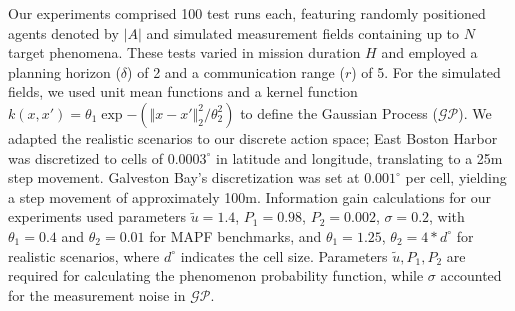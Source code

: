 \documentclass[letterpaper, 10 pt, conference]{IEEEConference}
\begin{document}
Our experiments comprised 100 test runs each, featuring randomly positioned agents denoted by $|A|$ and simulated measurement fields containing up to $N$ target phenomena. These tests varied in mission duration $H$ and employed a planning horizon ($\delta$) of 2 and a communication range ($r$) of 5. For the simulated fields, we used unit mean functions and a kernel function $k(x, x') = \theta_1\exp{- (\Vert x - x' \Vert_2^2 / \theta_2^2)}$ to define the Gaussian Process ($\mathcal{GP}$). We adapted the realistic scenarios to our discrete action space; East Boston Harbor was discretized to cells of $0.0003^\circ$ in latitude and longitude, translating to a 25m step movement. Galveston Bay's discretization was set at $0.001^\circ$ per cell, yielding a step movement of approximately 100m. Information gain calculations for our experiments used parameters $\tilde{u} = 1.4$, $P_1 = 0.98$, $P_2 = 0.002$, $\sigma = 0.2$, with $\theta_1 = 0.4$ and $\theta_2 = 0.01$ for MAPF benchmarks, and $\theta_1 = 1.25$, $\theta_2 = 4*d^{\circ}$ for realistic scenarios, where $d^{\circ}$ indicates the cell size. Parameters $\tilde{u}, P_1, P_2$ are required for calculating the phenomenon probability function, while $\sigma$ accounted for the measurement noise in $\mathcal{GP}$.


\end{document}
